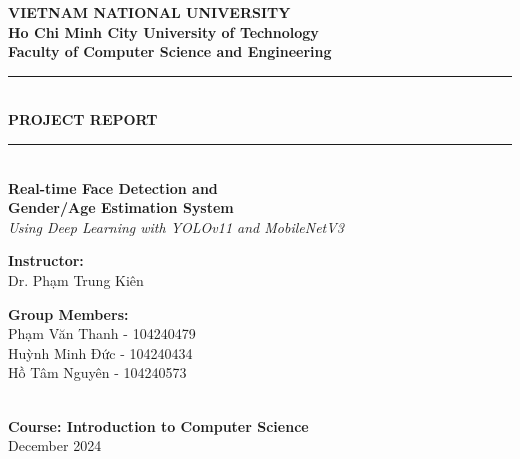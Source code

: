 \documentclass[12pt,a4paper]{article}
\begin{document}
\begin{titlepage}
    \centering
    \vspace*{1cm}
    
    \textbf{\Large VIETNAM NATIONAL UNIVERSITY}\\[0.3cm]
    \textbf{\large Ho Chi Minh City University of Technology}\\[0.3cm]
    \textbf{\large Faculty of Computer Science and Engineering}\\[2cm]
    
    \rule{\linewidth}{0.5mm}\\[0.4cm]
    {\Huge\textbf{PROJECT REPORT}}\\[0.3cm]
    \rule{\linewidth}{0.5mm}\\[1.5cm]
    
    {\LARGE\textbf{Real-time Face Detection and}}\\[0.3cm]
    {\LARGE\textbf{Gender/Age Estimation System}}\\[0.3cm]
    {\large\textit{Using Deep Learning with YOLOv11 and MobileNetV3}}\\[2cm]
    
    \begin{minipage}[t]{0.45\textwidth}
        \begin{flushleft}
            \textbf{Instructor:}\\
            Dr. Phạm Trung Kiên
        \end{flushleft}
    \end{minipage}
    \hfill
    \begin{minipage}[t]{0.45\textwidth}
        \begin{flushright}
            \textbf{Group Members:}\\
            Phạm Văn Thanh - 104240479\\
            Huỳnh Minh Đức - 104240434\\
            Hồ Tâm Nguyên - 104240573
        \end{flushright}
    \end{minipage}\\[3cm]
    
    \textbf{Course: Introduction to Computer Science}\\[1cm]
    
    \vfill
    {\large December 2024}
    
\end{titlepage}

\tableofcontents
\newpage
\end{document}
